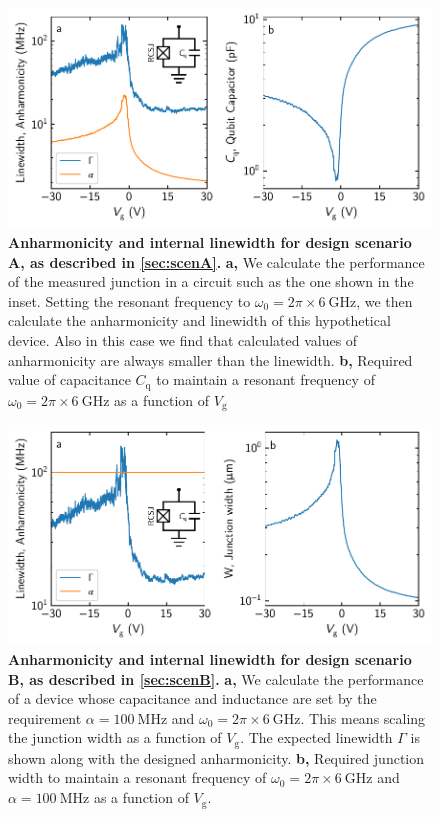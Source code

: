 \begin{figure}[]
	\centering
	\includegraphics[width=.9\linewidth]{chapter-gJJ/figs/supp_anharmonicity_2.pdf}
	\caption{{\bf Anharmonicity and internal linewidth for design scenario A, as described in \ref{sec:scenA}.}
		\textbf{a,} We calculate the performance of the measured junction in a circuit such as the one shown in the inset.
		Setting the resonant frequency to $\omega_0 = 2\pi\times\SI{6}{\giga\hertz}$, we then calculate the anharmonicity and linewidth of this hypothetical device.
		Also in this case we find that calculated values of anharmonicity are always smaller than the linewidth.
		\textbf{b,} Required value of capacitance $C_\text{q}$ to maintain a resonant frequency of $\omega_0 = 2\pi\times\SI{6}{\giga\hertz}$ as a function of $V_\text{g}$}
	\label{gJJfig:anharm2}
\end{figure}

\begin{figure}[]
	\centering
	\includegraphics[width=.9\linewidth]{chapter-gJJ/figs/supp_anharmonicity_3.pdf}
	\caption{{\bf Anharmonicity and internal linewidth for design scenario B, as described in \ref{sec:scenB}.}
		\textbf{a,} We calculate the performance of a device whose capacitance and inductance are set by the requirement $\alpha = \SI{100}{\mega\hertz}$ and $\omega_0 = 2\pi\times\SI{6}{\giga\hertz}$.  This means scaling the junction width as a function of $V_\text{g}$.  The expected linewidth $\Gamma$ is shown along with the designed anharmonicity.
		\textbf{b,} Required junction width to maintain a resonant frequency of $\omega_0 = 2\pi\times\SI{6}{\giga\hertz}$ and $\alpha = \SI{100}{\mega\hertz}$ as a function of $V_\text{g}$.}
	\label{gJJfig:anharm3}
\end{figure}

